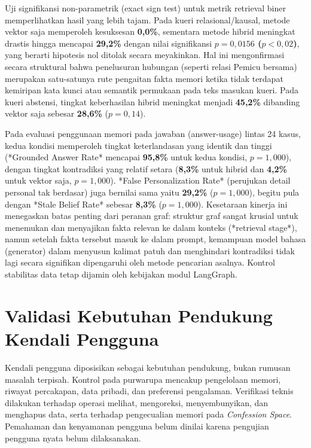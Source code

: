 Uji signifikansi non-parametrik (exact sign test) untuk metrik retrieval biner memperlihatkan hasil yang lebih tajam. Pada kueri relasional/kausal, metode vektor saja memperoleh kesuksesan \textbf{0,0\%}, sementara metode hibrid meningkat drastis hingga mencapai \textbf{29,2\%} dengan nilai signifikansi \textbf{$p = 0,0156$ ($p < 0,02$)}, yang berarti hipotesis nol ditolak secara meyakinkan. Hal ini mengonfirmasi secara struktural bahwa penelusuran hubungan (seperti relasi Pemicu bersama) merupakan satu-satunya rute pengaitan fakta memori ketika tidak terdapat kemiripan kata kunci atau semantik permukaan pada teks masukan kueri. Pada kueri abstensi, tingkat keberhasilan hibrid meningkat menjadi \textbf{45,2\%} dibanding vektor saja sebesar \textbf{28,6\%} ($p = 0,14$).

Pada evaluasi penggunaan memori pada jawaban (answer-usage) lintas 24 kasus, kedua kondisi memperoleh tingkat keterlandasan yang identik dan tinggi (*Grounded Answer Rate* mencapai \textbf{95,8\%} untuk kedua kondisi, $p=1,000$), dengan tingkat kontradiksi yang relatif setara (\textbf{8,3\%} untuk hibrid dan \textbf{4,2\%} untuk vektor saja, $p=1,000$). *False Personalization Rate* (perujukan detail personal tak berdasar) juga bernilai sama yaitu \textbf{29,2\%} ($p=1,000$), begitu pula dengan *Stale Belief Rate* sebesar \textbf{8,3\%} ($p=1,000$). Kesetaraan kinerja ini menegaskan batas penting dari peranan graf: struktur graf sangat krusial untuk menemukan dan menyajikan fakta relevan ke dalam konteks (*retrieval stage*), namun setelah fakta tersebut masuk ke dalam prompt, kemampuan model bahasa (generator) dalam menyusun kalimat patuh dan menghindari kontradiksi tidak lagi secara signifikan dipengaruhi oleh metode pencarian asalnya. Kontrol stabilitas data tetap dijamin oleh kebijakan modul LangGraph.

\section{Validasi Kebutuhan Pendukung Kendali Pengguna}
\label{sec:v2-user-control}

Kendali pengguna diposisikan sebagai kebutuhan pendukung, bukan rumusan masalah terpisah. Kontrol pada purwarupa mencakup pengelolaan memori, riwayat percakapan, data pribadi, dan preferensi pengalaman. Verifikasi teknis dilakukan terhadap operasi melihat, mengoreksi, menyembunyikan, dan menghapus data, serta terhadap pengecualian memori pada \textit{Confession Space}. Pemahaman dan kenyamanan pengguna belum dinilai karena pengujian pengguna nyata belum dilaksanakan.

